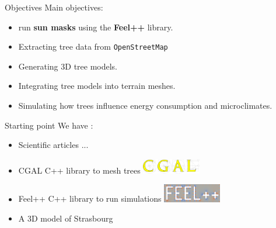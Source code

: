 \documentclass[10pt]{beamer}
\begin{document}
\begin{frame}{Objectives}
  Main objectives: 
  \begin{itemize}
  \item run \textbf{sun masks} using the \textbf{Feel++} library.
  \end{itemize}
  \vspace{0.5cm}

\begin{itemize}
    \item Extracting tree data from \texttt{OpenStreetMap}
    \item Generating 3D tree models.
    \item Integrating tree models into terrain meshes.
    \item Simulating how trees influence energy consumption and microclimates.
\end{itemize}
\end{frame}

\begin{frame}{Starting point}
  We have :
  \begin{itemize}
    \item Scientific articles \cite{Verdie14} \cite{Verdie15} \cite{Stava14} ...
    \item CGAL\cite{cgal} C++ library to mesh trees \includegraphics[width=0.2\textwidth]{images/cgal_logo.png}
    \item Feel++\cite{feel++} C++ library to run simulations \includegraphics[width=0.2\textwidth]{images/feelpp.png}
    \item A 3D model of Strasbourg
  \end{itemize}
\end{frame}
\end{document}
